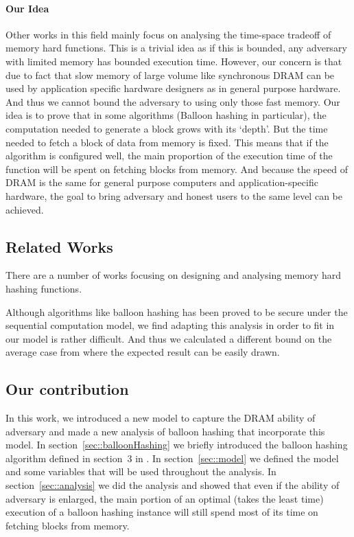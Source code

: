 \documentclass[a4paper]{article}
\begin{document}
\paragraph{Our Idea}
Other works in this field mainly focus on analysing the time-space tradeoff of memory hard functions. This is a trivial
idea as if this is bounded, any adversary with limited memory has bounded execution time. However, our concern is that
due to fact that slow memory of large volume like synchronous DRAM can be used by application specific hardware designers
as in general purpose hardware. And thus we cannot bound the adversary to using only those fast memory. Our idea is to
prove that in some algorithms (Balloon hashing in particular), the computation needed to generate a block grows with its
`depth'. But the time needed to fetch a block of data from memory is fixed. This means that if the algorithm is configured
well, the main proportion of the execution time of the function will be spent on fetching blocks from memory. And because
the speed of DRAM is the same for general purpose computers and application-specific hardware, the goal to bring adversary
and honest users to the same level can be achieved.

\subsection{Related Works}
There are a number of works focusing on designing and analysing memory hard hashing functions. 

Although algorithms like balloon hashing has been proved to be secure under the sequential computation model, we find
adapting this analysis in order to fit in our model is rather difficult. And thus we calculated a different bound on
the average case from where the expected result can be easily drawn.

\subsection{Our contribution}
In this work, we introduced a new model to capture the DRAM ability of adversary and made a new analysis of
balloon hashing that incorporate this model. In section~\ref{sec::balloonHashing} we briefly introduced the
balloon hashing algorithm defined in section~3 in \cite{corrigan2016balloon}.
In section~\ref{sec::model} we defined the model and some variables
that will be used throughout the analysis. In section~\ref{sec::analysis} we did the analysis and showed that even
if the ability of adversary is enlarged, the main portion of an optimal (takes the least time) execution of
a balloon hashing instance will still spend most of its time on fetching blocks from memory.
\end{document}
